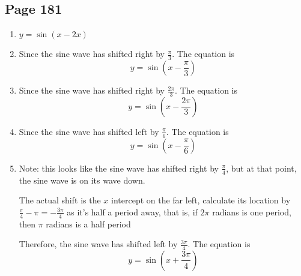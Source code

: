 \documentclass{article}
\newenvironment{solutions}[1]
{\subsection*{#1}
 \begin{enumerate}[leftmargin=1.5em]}
{\end{enumerate}}
\newcommand{\solution}{\item}
\begin{document}
\begin{solutions}{Page 181}
\solution
$y= \sin\left(x-2x\right)$ 


\solution
Since the sine wave has shifted right by $\frac{\pi}{3}$. The equation is \[y=\sin\left(x-\frac{\pi}{3}\right) \]

\solution
Since the sine wave has shifted right by $\frac{2\pi}{3}$. The equation is \[y=\sin\left(x-\frac{2\pi}{3}\right) \]

\solution
Since the sine wave has shifted left by $\frac{\pi}{6}$. The equation is \[y=\sin\left(x-\frac{\pi}{6}\right) \]

\solution
Note: this looks like the sine wave has shifted right by $\frac{\pi}{4}$, but at that point, the sine wave is on its wave down. 

The actual shift is the $x$ intercept on the far left, calculate its location by $\frac{\pi}{4}- \pi = -\frac{3\pi}{4}$ as it's half a period away, that is, if $2\pi$ radians is one period, then $\pi$ radians is a half period

Therefore, the sine wave has shifted left by $\frac{3\pi}{4}$. The equation is \[y=\sin\left(x+\frac{3\pi}{4}\right) \]
\end{solutions}
\end{document}
